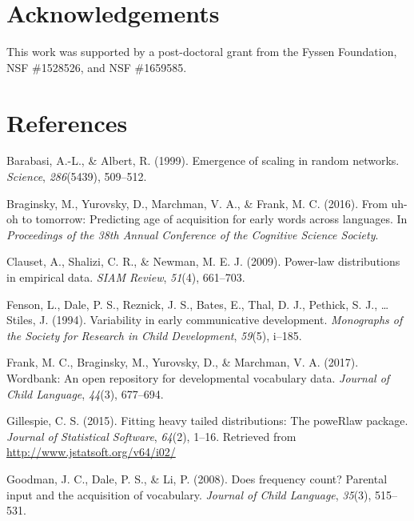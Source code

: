 \documentclass[10pt, letterpaper]{article}
\begin{document}
\section{Acknowledgements}\label{acknowledgements}

This work was supported by a post-doctoral grant from the Fyssen
Foundation, NSF \#1528526, and NSF \#1659585.

\section{References}\label{references}

\setlength{\parindent}{-0.1in} \setlength{\leftskip}{0.125in} \noindent

\hypertarget{refs}{}
\hypertarget{ref-barabasi99}{}
Barabasi, A.-L., \& Albert, R. (1999). Emergence of scaling in random
networks. \emph{Science}, \emph{286}(5439), 509--512.

\hypertarget{ref-braginsky2016}{}
Braginsky, M., Yurovsky, D., Marchman, V. A., \& Frank, M. C. (2016).
From uh-oh to tomorrow: Predicting age of acquisition for early words
across languages. In \emph{Proceedings of the 38th Annual Conference of
the Cognitive Science Society}.

\hypertarget{ref-clauset09}{}
Clauset, A., Shalizi, C. R., \& Newman, M. E. J. (2009). Power-law
distributions in empirical data. \emph{SIAM Review}, \emph{51}(4),
661--703.

\hypertarget{ref-fenson94}{}
Fenson, L., Dale, P. S., Reznick, J. S., Bates, E., Thal, D. J.,
Pethick, S. J., \ldots{} Stiles, J. (1994). Variability in early
communicative development. \emph{Monographs of the Society for Research
in Child Development}, \emph{59}(5), i--185.

\hypertarget{ref-frank2017}{}
Frank, M. C., Braginsky, M., Yurovsky, D., \& Marchman, V. A. (2017).
Wordbank: An open repository for developmental vocabulary data.
\emph{Journal of Child Language}, \emph{44}(3), 677--694.

\hypertarget{ref-gillespie15}{}
Gillespie, C. S. (2015). Fitting heavy tailed distributions: The
poweRlaw package. \emph{Journal of Statistical Software}, \emph{64}(2),
1--16. Retrieved from \url{http://www.jstatsoft.org/v64/i02/}

\hypertarget{ref-goodman2008}{}
Goodman, J. C., Dale, P. S., \& Li, P. (2008). Does frequency count?
Parental input and the acquisition of vocabulary. \emph{Journal of Child
Language}, \emph{35}(3), 515--531.
\end{document}
